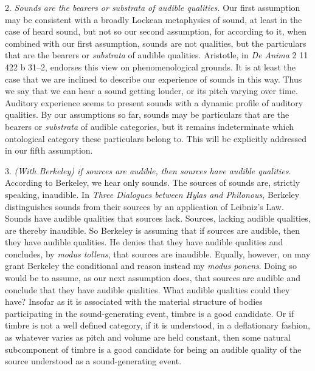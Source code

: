 \documentclass[12pt]{article}
\begin{document}
2. \emph{Sounds are the bearers or \emph{substrata} of audible qualities.} Our first assumption may be consistent with a broadly Lockean metaphysics of sound, at least in the case of heard sound, but not so our second assumption, for according to it, when combined with our first assumption, sounds are not qualities, but the particulars that are the bearers or \emph{substrata} of audible qualities. Aristotle, in \emph{De Anima} 2 11 422 b 31--2, endorses this view on phenomenological grounds. It is at least the case that we are inclined to describe our experience of sounds in this way. Thus we say that we can hear a sound getting louder, or its pitch varying over time. Auditory experience seems to present sounds with a dynamic profile of auditory qualities. By our assumptions so far, sounds may be particulars that are the bearers or \emph{substrata} of audible categories, but it remains indeterminate which ontological category these particulars belong to. This will be explicitly addressed in our fifth assumption.

3. \emph{(With Berkeley) if sources are audible, then sources have audible qualities.} According to Berkeley, we hear only sounds. The sources of sounds are, strictly speaking, inaudible. In \emph{Three Dialogues between Hylas and Philonous}, Berkeley distinguishes sounds from their sources by an application of Leibniz's Law. Sounds have audible qualities that sources lack. Sources, lacking audible qualities, are thereby inaudible. So Berkeley is assuming that if sources are audible, then they have audible qualities. He denies that they have audible qualities and concludes, by \emph{modus tollens}, that sources are inaudible. Equally, however, on may grant Berkeley the conditional and reason instead my \emph{modus ponens}. Doing so would be to assume, as our next assumption does, that sources are audible and conclude that they have audible qualities. What audible qualities could they have? Insofar as it is associated with the material structure of bodies participating in the sound-generating event, timbre is a good candidate. Or if timbre is not a well defined category, if it is understood, in a deflationary fashion, as whatever varies as pitch and volume are held constant, then some natural subcomponent of timbre is a good candidate for being an audible quality of the source understood as a sound-generating event.
\end{document}
